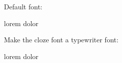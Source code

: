 

Default font:

lorem  dolor

Make the cloze font a typewriter font:

\clozesetfont{\tt}

lorem  dolor

\bye
